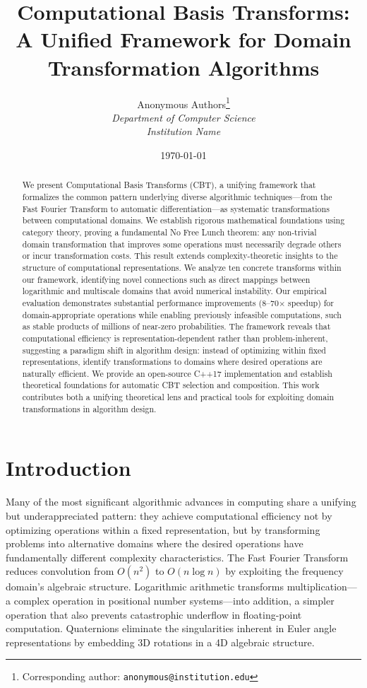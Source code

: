 \documentclass[11pt]{article}
\title{Computational Basis Transforms:\\
A Unified Framework for Domain Transformation Algorithms}
\author{
    Anonymous Authors\footnote{Corresponding author: \texttt{anonymous@institution.edu}}\\
    \textit{Department of Computer Science}\\
    \textit{Institution Name}
}
\date{\today}
\theoremstyle{definition}
\begin{document}
\maketitle

\begin{abstract}
We present Computational Basis Transforms (CBT), a unifying framework that formalizes the common pattern underlying diverse algorithmic techniques—from the Fast Fourier Transform to automatic differentiation—as systematic transformations between computational domains. We establish rigorous mathematical foundations using category theory, proving a fundamental No Free Lunch theorem: any non-trivial domain transformation that improves some operations must necessarily degrade others or incur transformation costs. This result extends complexity-theoretic insights to the structure of computational representations. We analyze ten concrete transforms within our framework, identifying novel connections such as direct mappings between logarithmic and multiscale domains that avoid numerical instability. Our empirical evaluation demonstrates substantial performance improvements (8--70× speedup) for domain-appropriate operations while enabling previously infeasible computations, such as stable products of millions of near-zero probabilities. The framework reveals that computational efficiency is representation-dependent rather than problem-inherent, suggesting a paradigm shift in algorithm design: instead of optimizing within fixed representations, identify transformations to domains where desired operations are naturally efficient. We provide an open-source C++17 implementation and establish theoretical foundations for automatic CBT selection and composition. This work contributes both a unifying theoretical lens and practical tools for exploiting domain transformations in algorithm design.
\end{abstract}

\section{Introduction}

Many of the most significant algorithmic advances in computing share a unifying but underappreciated pattern: they achieve computational efficiency not by optimizing operations within a fixed representation, but by transforming problems into alternative domains where the desired operations have fundamentally different complexity characteristics. The Fast Fourier Transform \cite{cooley1965algorithm} reduces convolution from $O(n^2)$ to $O(n \log n)$ by exploiting the frequency domain's algebraic structure. Logarithmic arithmetic \cite{napier1614mirifici} transforms multiplication—a complex operation in positional number systems—into addition, a simpler operation that also prevents catastrophic underflow in floating-point computation. Quaternions \cite{hamilton1844quaternions} eliminate the singularities inherent in Euler angle representations by embedding 3D rotations in a 4D algebraic structure.
\end{document}
